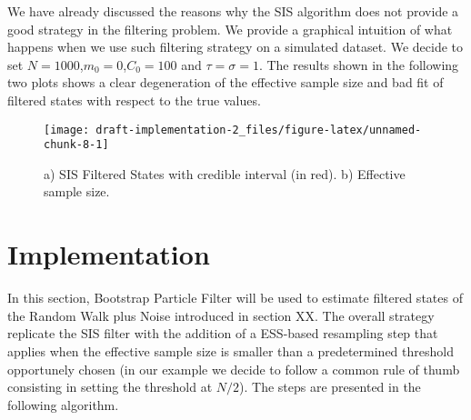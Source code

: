 \documentclass[
]{article}
\begin{document}
We have already discussed the reasons why the SIS algorithm does not
provide a good strategy in the filtering problem. We provide a graphical
intuition of what happens when we use such filtering strategy on a
simulated dataset. We decide to set \(N=1000\),\(m_{0}=0\),\(C_{0}=100\)
and \(\tau=\sigma=1\). The results shown in the following two plots
shows a clear degeneration of the effective sample size and bad fit of
filtered states with respect to the true values.

\begin{figure}[ht]

{\centering \texttt{[image: draft-implementation-2\_files/figure-latex/unnamed-chunk-8-1]} 

}

\caption{a) SIS Filtered States with credible interval (in red). b) Effective sample size.}\label{fig:unnamed-chunk-8}
\end{figure}

\section{Implementation}

In this section, Bootstrap Particle Filter will be used to estimate
filtered states of the Random Walk plus Noise introduced in section XX.
The overall strategy replicate the SIS filter with the addition of a
ESS-based resampling step that applies when the effective sample size is
smaller than a predetermined threshold opportunely chosen (in our
example we decide to follow a common rule of thumb consisting in setting
the threshold at \(N/2\)). The steps are presented in the following
algorithm.
\end{document}
